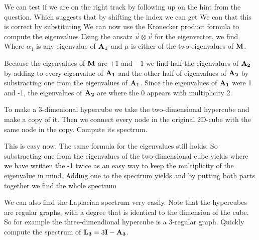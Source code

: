 We can test if we are on the right track by following up on the hint from the question. Which suggests that by shifting the index we can get 
We can that this is correct by substituting
We can now use the Kronecker product formula to compute the eigenvalues Using the ansatz $\vec{u}\otimes\vec{v}$ for the eigenvector, we find
Where $\alpha_1$ is any eigenvalue of $\bf A_1$ and $\mu$ is either of the two eigenvalues of $\bf M$.

Because the eigenvalues of $\bf M$ are $+1$ and $-1$ we find half the eigenvalues of $\bf A_2$ by adding to every eigenvalue of $\bf A_1$ and the other half of eigenvalues of $\bf A_2$ by substracting one from the eigenvalues of $\bf A_1$. Since the eigenvalues of $\bf A_1$ were 1 and -1, the eigenvalues of $\bf A_2$ are
where the 0 appears with multiplicity 2. 

\subquestion
To make a 3-dimenional hypercube we take the two-dimensional hypercube and make a copy of it. Then we connect every node in the original 2D-cube with the same node in the copy. Compute its spectrum. 

\solution 
This is easy now. The same formula for the eigenvalues still holds. So substracting one from the eigenvalues of the two-dimensional cube yields
where we have written the -1 twice as an easy way to keep the multiplicity of the eigenvalue in mind. Adding one to the spectrum yields
and by putting both parts together we find the whole spectrum

\subquestion
We can also find the Laplacian spectrum very easily. Note that the hypercubes are regular graphs, with a degree that is identical to the dimension of the cube. So for example the three-dimendional hypercube is a 3-regular graph. 
Quickly compute the spectrum of ${\bf L_3}=3{\bf I}-{\bf A_3}$.

